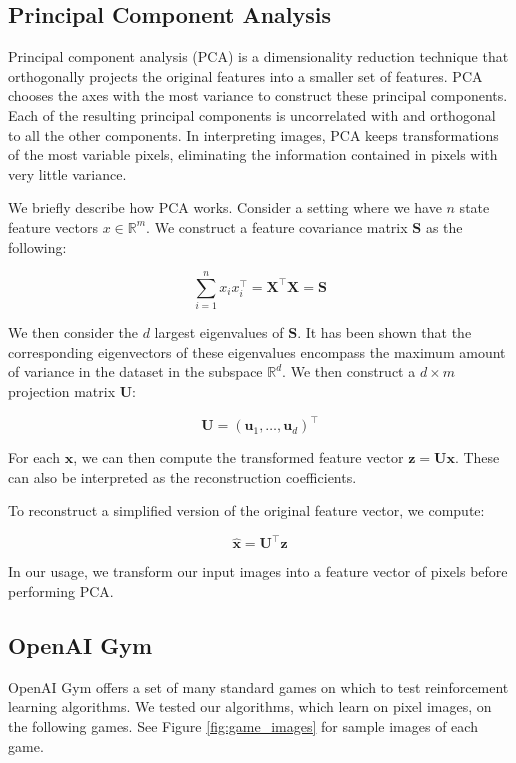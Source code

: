 \documentclass[11pt]{article}
\begin{document}
\subsection{Principal Component Analysis}

Principal component analysis (PCA) is a dimensionality reduction technique that orthogonally projects the original features into a smaller set of features. PCA chooses the axes with the most variance to construct these principal components. Each of the resulting principal components is uncorrelated with and orthogonal to all the other components. In interpreting images, PCA keeps transformations of the most variable pixels, eliminating the information contained in pixels with very little variance.


We briefly describe how PCA works. Consider a setting where we have $n$ state feature vectors $x \in \mathbb{R}^m$. We construct a feature covariance matrix $\mathbf{S}$ as the following:

$$\sum_{i=1}^n x_i x_i^\top = \mathbf{X}^\top \mathbf{X} = \mathbf{S}$$

We then consider the $d$ largest eigenvalues of $\mathbf{S}$. It has been shown that the corresponding eigenvectors of these eigenvalues encompass the maximum amount of variance in the dataset in the subspace $\mathbb{R}^d$. We then construct a $d \times m$ projection matrix $\mathbf{U}$:

$$\mathbf{U} = (\mathbf{u}_1, \ldots, \mathbf{u}_d)^\top$$

For each $\mathbf{x}$, we can then compute the transformed feature vector $\mathbf{z} = \mathbf{U}\mathbf{x}$. These can also be interpreted as the reconstruction coefficients.

To reconstruct a simplified version of the original feature vector, we compute:

$$\hat{\mathbf{x}} = \mathbf{U}^\top \mathbf{z}$$

In our usage, we transform our input images into a feature vector of pixels before performing PCA.


\subsection{OpenAI Gym}

OpenAI Gym \cite{brockman2016openai} offers a set of many standard games on which to test reinforcement learning algorithms. We tested our algorithms, which learn on pixel images, on the following games. See Figure \ref{fig:game_images} for sample images of each game.
\end{document}
